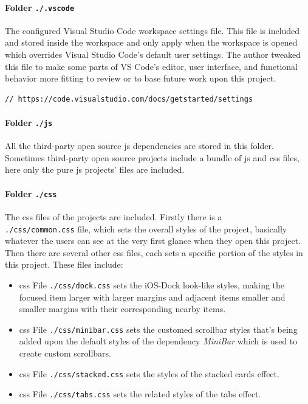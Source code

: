 \paragraph{Folder \texttt{./.vscode}}

The configured Visual Studio Code workspace settings file. This file is included and stored inside the workspace and only apply when the workspace is opened which overrides Visual Studio Code's default user settings. The author tweaked this file to make some parts of VS Code's editor, user interface, and functional behavior more fitting to review or to base future work upon this project.

\begin{verbatim}
// https://code.visualstudio.com/docs/getstarted/settings
\end{verbatim}

\paragraph{Folder \texttt{./js}}

All the third-party open source \gls{js} dependencies are stored in this folder. Sometimes third-party open source projects include a bundle of \acrfull{js} and \gls{css} files, here only the pure \gls{js} projects' files are included.

\paragraph{Folder \texttt{./css}}

The \gls{css} files of the projects are included. Firstly there is a \\\texttt{./css/common.css} file, which sets the overall styles of the project, basically whatever the users can see at the very first glance when they open this project. Then there are several other \gls{css} files, each sets a specific portion of the styles in this project. These files include:

\begin{itemize}
\item \gls{css} File \texttt{./css/dock.css} sets the iOS-Dock look-like styles, making the focused item larger with larger margins and adjacent items smaller and smaller margins with their corresponding nearby items.
\item \gls{css} File \texttt{./css/minibar.css} sets the customed scrollbar styles that's being added upon the default styles of the dependency \emph{MiniBar} which is used to create custom scrollbars.
\item \gls{css} File \texttt{./css/stacked.css} sets the styles of the stacked cards effect.
\item \gls{css} File \texttt{./css/tabs.css} sets the related styles of the tabs effect.
\end{itemize}

